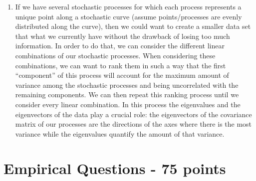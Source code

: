 \documentclass{article}
\begin{document}
\begin{enumerate}
    \item If we have several stochastic processes for which each process represents a unique point along a stochastic curve (assume points/processes are evenly distributed along the curve), then we could want to create a smaller data set that what we currently have without the drawback of losing too much information. In order to do that, we can consider the different linear combinations of our stochastic processes. When considering these combinations, we can want to rank them in such a way that the first “component” of this process will account for the maximum amount of variance among the stochastic processes and being uncorrelated with the remaining components. We can then repeat this ranking process until we consider every linear combination. In this process the eigenvalues and the eigenvectors of the data play a crucial role: the eigenvectors of the covariance matrix of our processes are the directions of the axes where there is the most variance while the eigenvalues quantify the amount of that variance.
\end{enumerate}



\section*{Empirical Questions - 75 points} 
\end{document}
